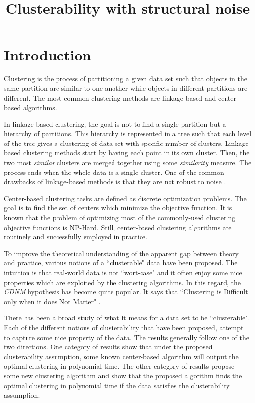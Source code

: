\documentclass[twoside]{article}
\title{\LARGE Clusterability with structural noise}
\author{}
\begin{document}
\maketitle


\begin{abstract}
\end{abstract}
\section{Introduction}
Clustering is the process of partitioning a given data set such that objects in the same partition are similar to one another while objects in different partitions are different. The most common clustering methods are linkage-based and center-based algorithms.

 In linkage-based clustering, the goal is not to find a single partition but a hierarchy of partitions. This hierarchy is represented in a tree such that each level of the tree gives a clustering of data set with specific number of clusters. Linkage-based clustering methods start by having each point in its own cluster. Then, the two most \emph{similar} clusters are merged together using some \emph{similarity} measure. The process ends when the whole data is a single cluster. One of the common drawbacks of linkage-based methods is that they are not robust to noise \cite{narasimhan2005q}. 

Center-based clustering tasks are defined as discrete optimization problems. The goal is to find the set of centers which minimize the objective function. It is known that the problem of optimizing most of the commonly-used clustering objective functions is NP-Hard. Still, center-based clustering algorithms are routinely and successfully employed in practice.

To improve the theoretical understanding of the apparent gap between theory and practice, various notions of a ``clusterable" data have been proposed. The intuition is that real-world data is not ``wort-case" and it often enjoy some nice properties which are exploited by the clustering algorithms. In this regard, the \emph{CDNM} hypothesis has become quite popular. It says that ``Clustering is Difficult only when it does Not Matter" \cite{daniely2012clustering}.    

There has been a broad study of what it means for a data set to be ``clusterable". Each of the different notions of clusterability that have been proposed, attempt to capture some nice property of the data. The results generally follow one of the two directions. One category of results show that under the proposed clusterability assumption, some known center-based algorithm will output the optimal clustering in polynomial time. The other category of results propose some new clustering algorithm and show that the proposed algorithm finds the optimal clustering in polynomial time if the data satisfies the clusterability assumption. 
\end{document}
